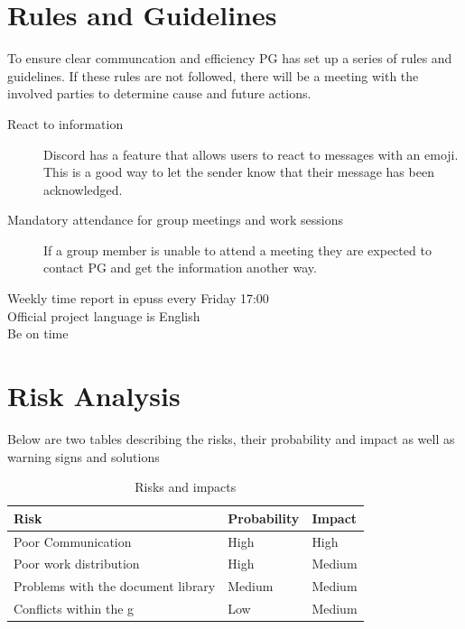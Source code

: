 \documentclass{article}
\begin{document}
\section{Rules and Guidelines} %
    To ensure clear communcation and efficiency PG has set up a series of rules and guidelines. If these rules are not followed, there will be a meeting with the involved parties to determine cause and future actions. 
    
    \begin{description}
        \item[React to information] Discord has a feature that allows users to react to messages with an emoji. This is a good way to let the sender know that their message has been acknowledged.
        \item[Mandatory attendance for group meetings and work sessions] If a group member is unable to attend a meeting they are expected to contact PG and get the information another way.  
        \item[Weekly time report in epuss every Friday 17:00]
        \item[Official project language is English]
        \item[Be on time]
    \end{description}

\section{Risk Analysis}
    Below are two tables describing the risks, their probability and impact as well as warning signs and solutions
    
    \begin{table}[h]
        \centering
        \begin{tabular}{|l|l|l|}
             \hline
             Risk 
             & Probability
             & Impact \\
             \hline
             Poor Communication 
             & High
             & High \\
             \hline
             Poor work distribution
             & High
             & Medium \\
             \hline
             Problems with the document library
             & Medium
             & Medium \\
             \hline
             Conflicts within the g
             & Low
             & Medium \\
             \hline
        \end{tabular}
        \caption{Risks and impacts}
        \label{tab:my_label}
    \end{table}
\end{document}
